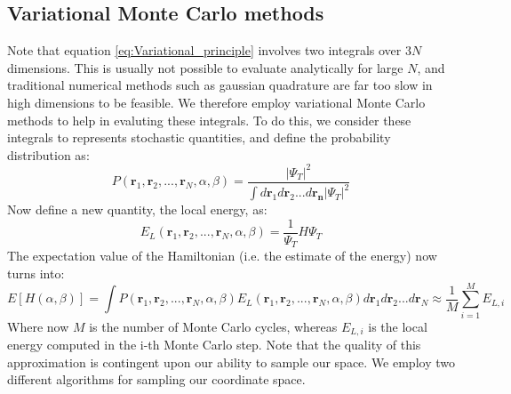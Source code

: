 \documentclass[a4paper, 10pt]{article}
\begin{document}
	\subsection{Variational Monte Carlo methods}
	Note that equation \ref{eq:Variational_principle} involves two integrals over $3N$ dimensions. This is usually not possible to evaluate analytically for large $N$, and traditional numerical methods such as gaussian quadrature are far too slow in high dimensions to be feasible. We therefore employ variational Monte Carlo methods to help in evaluting these integrals. To do this, we consider these integrals to represents stochastic quantities, and define the probability distribution as:
	\begin{equation}
	P(\boldsymbol{r}_1, \boldsymbol{r}_2,...,\boldsymbol{r}_N, \alpha,\beta)=\frac{|\Psi_T|^2}{\int d\boldsymbol{r}_1d\boldsymbol{r}_2...d\boldsymbol{r_n}|\Psi_T|^2}
	\end{equation}
	Now define a new quantity, the local energy, as:
	\begin{equation}\label{eq:Local_energy_general_expression}
	E_L(\boldsymbol{r}_1, \boldsymbol{r}_2,...,\boldsymbol{r}_N, \alpha,\beta)=\frac{1}{\Psi_T}H\Psi_T
	\end{equation}
	The	expectation value of the Hamiltonian (i.e. the estimate of the energy) now turns into:
	\begin{equation}\label{eq:Expectation_Hamiltonian}
	E[H(\alpha, \beta)]=\int P(\boldsymbol{r}_1, \boldsymbol{r}_2,...,\boldsymbol{r}_N, \alpha,\beta)E_L(\boldsymbol{r}_1, \boldsymbol{r}_2,...,\boldsymbol{r}_N, \alpha,\beta)d\boldsymbol{r}_1d\boldsymbol{r}_2...d\boldsymbol{r}_N\approx \frac{1}{M}\sum_{i=1}^M E_{L,i}
	\end{equation}
	Where now $M$ is the number of Monte Carlo cycles, whereas $E_{L,i}$ is the local energy computed in the i-th Monte Carlo step. Note that the quality of this approximation is contingent upon our ability to sample our space. We employ two different algorithms for sampling our coordinate space.
\end{document}
